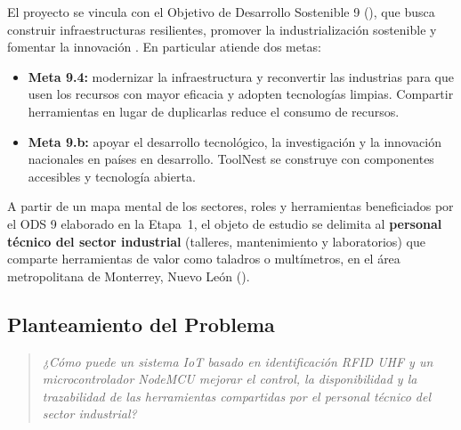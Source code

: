 El proyecto se vincula con el Objetivo de Desarrollo Sostenible 9 (), que busca construir infraestructuras resilientes, promover la industrialización sostenible y fomentar la innovación \parencite{un_desarrollo_sostenible_2015}. En particular atiende dos metas:
\begin{itemize}[leftmargin=1.2em]
    \item \textbf{Meta 9.4:} modernizar la infraestructura y reconvertir las industrias para que usen los recursos con mayor eficacia y adopten tecnologías limpias. Compartir herramientas en lugar de duplicarlas reduce el consumo de recursos.
    \item \textbf{Meta 9.b:} apoyar el desarrollo tecnológico, la investigación y la innovación nacionales en países en desarrollo. ToolNest se construye con componentes accesibles y tecnología abierta.
\end{itemize}
A partir de un mapa mental de los sectores, roles y herramientas beneficiados por el ODS 9 elaborado en la Etapa~1, el objeto de estudio se delimita al \textbf{personal técnico del sector industrial} (talleres, mantenimiento y laboratorios) que comparte herramientas de valor como taladros o multímetros, en el área metropolitana de Monterrey, Nuevo León ().

\begin{center}
\label{fig:rama-enfoque}
\end{center}

\subsection{Planteamiento del Problema}
\begin{quote}
\textit{¿Cómo puede un sistema IoT basado en identificación RFID UHF y un microcontrolador NodeMCU mejorar el control, la disponibilidad y la trazabilidad de las herramientas compartidas por el personal técnico del sector industrial?}
\end{quote}

